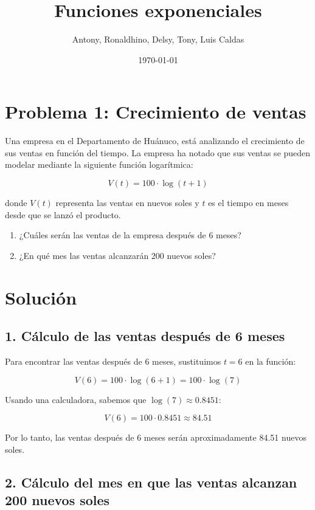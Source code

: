 \documentclass{article}
\begin{document}
\title{Funciones exponenciales}
\author{Antony, Ronaldhino, Delsy, Tony, Luis Caldas}
\date{\today}
\maketitle
\section*{Problema 1: Crecimiento de ventas}

Una empresa en el Departamento de Huánuco, está analizando el crecimiento de sus ventas en función del tiempo. La empresa ha notado que sus ventas se pueden modelar mediante la siguiente función logarítmica:

\[
V(t) = 100 \cdot \log(t + 1)
\]

donde \(V(t)\) representa las ventas en nuevos soles y \(t\) es el tiempo en meses desde que se lanzó el producto.


\begin{enumerate}
    \item ¿Cuáles serán las ventas de la empresa después de 6 meses?
    \item ¿En qué mes las ventas alcanzarán 200 nuevos soles?
\end{enumerate}

\section*{Solución}

\subsection*{1. Cálculo de las ventas después de 6 meses}

Para encontrar las ventas después de 6 meses, sustituimos \(t = 6\) en la función:

\[
V(6) = 100 \cdot \log(6 + 1) = 100 \cdot \log(7)
\]

Usando una calculadora, sabemos que \(\log(7) \approx 0.8451\):

\[
V(6) = 100 \cdot 0.8451 \approx 84.51
\]

Por lo tanto, las ventas después de 6 meses serán aproximadamente 84.51 nuevos soles.

\subsection*{2. Cálculo del mes en que las ventas alcanzan 200 nuevos soles}
\end{document}
